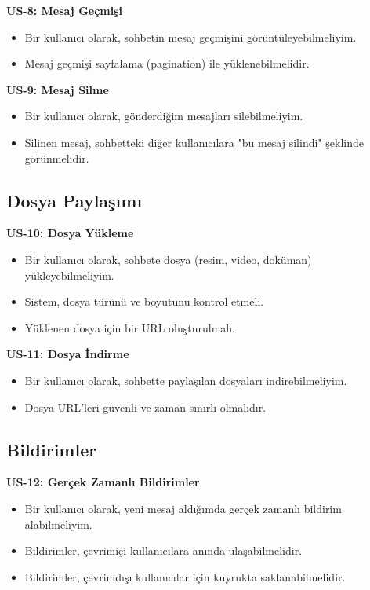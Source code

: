 \textbf{US-8: Mesaj Geçmişi}
\begin{itemize}
    \item Bir kullanıcı olarak, sohbetin mesaj geçmişini görüntüleyebilmeliyim.
    \item Mesaj geçmişi sayfalama (pagination) ile yüklenebilmelidir.
\end{itemize}

\textbf{US-9: Mesaj Silme}
\begin{itemize}
    \item Bir kullanıcı olarak, gönderdiğim mesajları silebilmeliyim.
    \item Silinen mesaj, sohbetteki diğer kullanıcılara "bu mesaj silindi" şeklinde görünmelidir.
\end{itemize}

\subsection{Dosya Paylaşımı}
\textbf{US-10: Dosya Yükleme}
\begin{itemize}
    \item Bir kullanıcı olarak, sohbete dosya (resim, video, doküman) yükleyebilmeliyim.
    \item Sistem, dosya türünü ve boyutunu kontrol etmeli.
    \item Yüklenen dosya için bir URL oluşturulmalı.
\end{itemize}

\textbf{US-11: Dosya İndirme}
\begin{itemize}
    \item Bir kullanıcı olarak, sohbette paylaşılan dosyaları indirebilmeliyim.
    \item Dosya URL'leri güvenli ve zaman sınırlı olmalıdır.
\end{itemize}

\subsection{Bildirimler}
\textbf{US-12: Gerçek Zamanlı Bildirimler}
\begin{itemize}
    \item Bir kullanıcı olarak, yeni mesaj aldığımda gerçek zamanlı bildirim alabilmeliyim.
    \item Bildirimler, çevrimiçi kullanıcılara anında ulaşabilmelidir.
    \item Bildirimler, çevrimdışı kullanıcılar için kuyrukta saklanabilmelidir.
\end{itemize}

